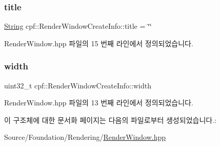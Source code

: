 \mbox{\label{structcpf_1_1_render_window_create_info_a47f2dbdd922a53792e16bd650064c77e}} 
\subsubsection{\texorpdfstring{title}{title}}
{\footnotesize\ttfamily \hyperlink{namespacecpf_a4dbd6992c3ed4440ce7ed8982ff7ffea}{String} cpf\+::\+Render\+Window\+Create\+Info\+::title = \char`\"{}\char`\"{}}



Render\+Window.\+hpp 파일의 15 번째 라인에서 정의되었습니다.

\mbox{\label{structcpf_1_1_render_window_create_info_a28983e1803a3065c8cc8beacb2b72f22}} 
\subsubsection{\texorpdfstring{width}{width}}
{\footnotesize\ttfamily uint32\+\_\+t cpf\+::\+Render\+Window\+Create\+Info\+::width}



Render\+Window.\+hpp 파일의 13 번째 라인에서 정의되었습니다.



이 구조체에 대한 문서화 페이지는 다음의 파일로부터 생성되었습니다.\+:\begin{DoxyCompactItemize}
\item 
Source/\+Foundation/\+Rendering/\hyperlink{_render_window_8hpp}{Render\+Window.\+hpp}\end{DoxyCompactItemize}
